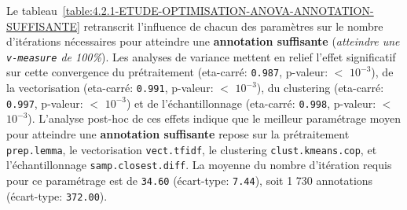 			
				Le tableau~\ref{table:4.2.1-ETUDE-OPTIMISATION-ANOVA-ANNOTATION-SUFFISANTE} retranscrit l'influence de chacun des paramètres sur le nombre d'itérations nécessaires pour atteindre une \textbf{annotation suffisante} (\textit{atteindre une \texttt{v-measure} de 100\%}).
				Les analyses de variance mettent en relief l'effet significatif sur cette convergence du prétraitement (eta-carré: \texttt{0.987}, p-valeur: \(<\) \texttt{\(10^{-3}\)}), de la vectorisation (eta-carré: \texttt{0.991}, p-valeur: \(<\) \texttt{\(10^{-3}\)}), du clustering (eta-carré: \texttt{0.997}, p-valeur: \(<\) \texttt{\(10^{-3}\)}) et de l'échantillonnage (eta-carré: \texttt{0.998}, p-valeur: \(<\) \texttt{\(10^{-3}\)}).
				L'analyse post-hoc de ces effets indique que le meilleur paramétrage moyen pour atteindre une \textbf{annotation suffisante} repose sur la prétraitement \texttt{prep.lemma}, le vectorisation \texttt{vect.tfidf}, le clustering \texttt{clust.kmeans.cop}, et l'échantillonnage \texttt{samp.closest.diff}. La moyenne du nombre d'itération requis pour ce paramétrage est de \texttt{34.60} (écart-type: \texttt{7.44}), soit 1 730 annotations (écart-type: \texttt{372.00}).
